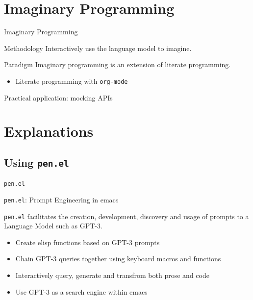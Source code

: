 \documentclass[presentation]{beamer}
\begin{document}
\section{Imaginary Programming}
\label{sec:orgf7ec0a5}
\begin{frame}[label={sec:org7f4f14d},fragile]{Imaginary Programming}
 \begin{block}{Methodology}
Interactively use the language model to imagine.
\end{block}

\begin{block}{Paradigm}
Imaginary programming is an extension of literate programming.

\begin{itemize}
\item Literate programming with \texttt{org-mode}
\end{itemize}
\end{block}

\begin{block}{Practical application: mocking APIs}

\end{block}
\end{frame}

\section{Explanations}
\label{sec:org376a1eb}
\subsection{Using \texttt{pen.el}}
\label{sec:org0f4523f}
\begin{frame}[label={sec:org4117155},fragile]{\texttt{pen.el}}
 \begin{block}{\texttt{pen.el}: Prompt Engineering in emacs}
{\footnotesize
\texttt{pen.el} facilitates the creation,
development, discovery and usage of prompts to
a Language Model such as GPT-3.

\begin{itemize}
\item Create elisp functions based on GPT-3 prompts
\item Chain GPT-3 queries together using keyboard macros and functions
\item Interactively query, generate and transfrom both prose and code
\item Use GPT-3 as a search engine within emacs
\end{itemize}
}
\end{block}
\end{frame}
\end{document}
